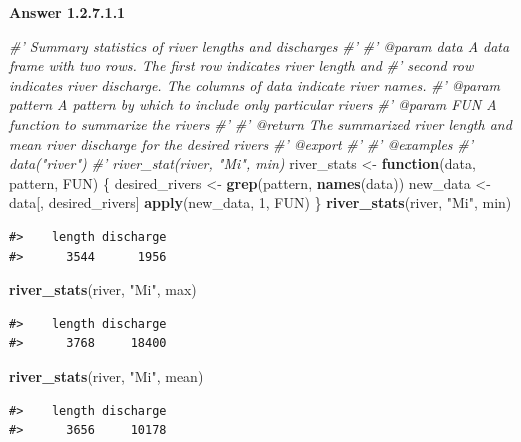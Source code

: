 \documentclass[
]{book}
\newenvironment{Shaded}{\begin{snugshade}}{\end{snugshade}}
\newcommand{\CommentTok}[1]{\textcolor[rgb]{0.56,0.35,0.01}{\textit{#1}}}
\newcommand{\ControlFlowTok}[1]{\textcolor[rgb]{0.13,0.29,0.53}{\textbf{#1}}}
\newcommand{\DecValTok}[1]{\textcolor[rgb]{0.00,0.00,0.81}{#1}}
\newcommand{\KeywordTok}[1]{\textcolor[rgb]{0.13,0.29,0.53}{\textbf{#1}}}
\newcommand{\NormalTok}[1]{#1}
\newcommand{\StringTok}[1]{\textcolor[rgb]{0.31,0.60,0.02}{#1}}
\begin{document}
\textbf{Answer 1.2.7.1.1}

\begin{Shaded}
\begin{Highlighting}[]
\CommentTok{#' Summary statistics of river lengths and discharges}
\CommentTok{#'}
\CommentTok{#' @param data A data frame with two rows. The first row indicates river length and}
\CommentTok{#'   second row indicates river discharge. The columns of data indicate river names.}
\CommentTok{#' @param pattern A pattern by which to include only particular rivers}
\CommentTok{#' @param FUN A function to summarize the rivers}
\CommentTok{#'}
\CommentTok{#' @return The summarized river length and mean river discharge for the desired rivers}
\CommentTok{#' @export}
\CommentTok{#'}
\CommentTok{#' @examples}
\CommentTok{#' data("river")}
\CommentTok{#' river_stat(river, "Mi", min)}
\NormalTok{river_stats <-}\StringTok{ }\ControlFlowTok{function}\NormalTok{(data, pattern, FUN) \{}
\NormalTok{  desired_rivers <-}\StringTok{ }\KeywordTok{grep}\NormalTok{(pattern, }\KeywordTok{names}\NormalTok{(data))}
\NormalTok{  new_data <-}\StringTok{ }\NormalTok{data[, desired_rivers]}
  \KeywordTok{apply}\NormalTok{(new_data, }\DecValTok{1}\NormalTok{, FUN)}
\NormalTok{\}}
\KeywordTok{river_stats}\NormalTok{(river, }\StringTok{"Mi"}\NormalTok{, min)}
\end{Highlighting}
\end{Shaded}

\begin{verbatim}
#>    length discharge 
#>      3544      1956
\end{verbatim}

\begin{Shaded}
\begin{Highlighting}[]
\KeywordTok{river_stats}\NormalTok{(river, }\StringTok{"Mi"}\NormalTok{, max)}
\end{Highlighting}
\end{Shaded}

\begin{verbatim}
#>    length discharge 
#>      3768     18400
\end{verbatim}

\begin{Shaded}
\begin{Highlighting}[]
\KeywordTok{river_stats}\NormalTok{(river, }\StringTok{"Mi"}\NormalTok{, mean)}
\end{Highlighting}
\end{Shaded}

\begin{verbatim}
#>    length discharge 
#>      3656     10178
\end{verbatim}
\end{document}
